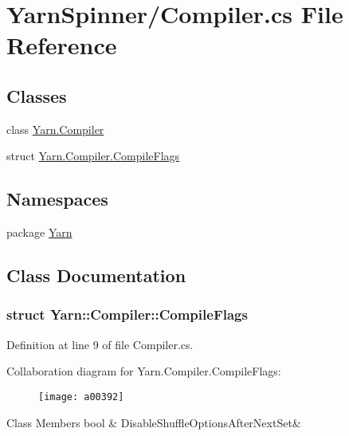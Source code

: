 \hypertarget{a00307}{\section{Yarn\-Spinner/\-Compiler.cs File Reference}
\label{a00307}
}
\subsection*{Classes}
\begin{DoxyCompactItemize}
\item 
class \hyperlink{a00056}{Yarn.\-Compiler}
\item 
struct \hyperlink{a00056_a00378}{Yarn.\-Compiler.\-Compile\-Flags}
\end{DoxyCompactItemize}
\subsection*{Namespaces}
\begin{DoxyCompactItemize}
\item 
package \hyperlink{a00053}{Yarn}
\end{DoxyCompactItemize}


\subsection{Class Documentation}
\label{a00378}
\hypertarget{a00056_a00378}{}
\subsubsection{struct Yarn\-:\-:Compiler\-:\-:Compile\-Flags}


Definition at line 9 of file Compiler.\-cs.



Collaboration diagram for Yarn.\-Compiler.\-Compile\-Flags\-:
\nopagebreak
\begin{figure}[H]
\begin{center}
\leavevmode
\texttt{[image: a00392]}
\end{center}
\end{figure}
\begin{DoxyFields}{Class Members}
\hypertarget{a00056_a8b49bb7763ff477cba21d7c771ef3ed0}{bool}\label{a00056_a8b49bb7763ff477cba21d7c771ef3ed0}
&
Disable\-Shuffle\-Options\-After\-Next\-Set&
\\
\hline

\end{DoxyFields}
